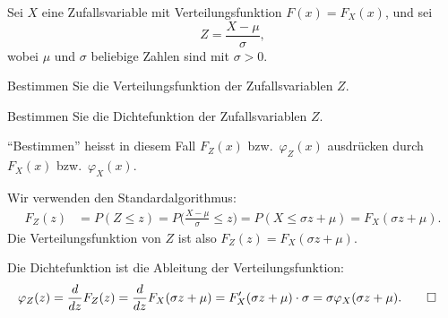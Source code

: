 Sei $X$ eine Zufallsvariable mit Verteilungsfunktion $F(x)=F_X(x)$, und
sei\[
Z=\frac{X-\mu}{\sigma},
\]
wobei $\mu$ und $\sigma$ beliebige Zahlen sind mit $\sigma > 0$.

\begin{teilaufgaben}
\item Bestimmen Sie die Verteilungsfunktion der Zufallsvariablen $Z$.
\item Bestimmen Sie die Dichtefunktion der Zufallsvariablen $Z$.
\end{teilaufgaben}
\begin{hinweis}
``Bestimmen'' heisst in diesem Fall $F_Z(x)$ bzw.~$\varphi_Z(x)$ ausdrücken durch
$F_X(x)$ bzw.~$\varphi_X(x)$.
\end{hinweis}


\begin{loesung}
\begin{teilaufgaben}
\item Wir verwenden den Standardalgorithmus:
\begin{align*}
F_Z(z)&=P(Z\le z)
=P\biggl(\frac{X-\mu}{\sigma}\le z\biggr)
=P(X\le \sigma z+\mu)=F_X(\sigma z+\mu).
\end{align*}
Die Verteilungsfunktion von $Z$ ist also $F_Z(z)=F_X(\sigma z+\mu)$.
\item Die Dichtefunktion ist die Ableitung der Verteilungsfunktion:
\begin{align*}
\varphi_Z(z)&=\frac{d}{dz}F_Z(z)
=\frac{d}{dz}F_X(\sigma z+ \mu)
=F_X'(\sigma z+ \mu)\cdot \sigma=\sigma\varphi_X(\sigma z+\mu).
\qedhere
\end{align*}
\end{teilaufgaben}
\end{loesung}

